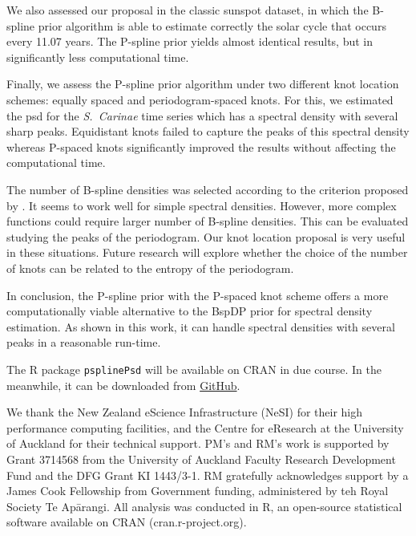 \documentclass[twocolumn,final]{svjour3}
\begin{document}

We also assessed our proposal in the classic sunspot dataset, in which the B-spline prior algorithm is able to estimate correctly the solar cycle that occurs every 11.07 years.  The P-spline prior yields almost identical results, but in  significantly  less computational time.  

Finally, we assess the P-spline prior algorithm under two different knot location schemes: equally spaced and periodogram-spaced knots.  For this, we estimated the psd for the {\it S.\ Carinae} time series which has a spectral density with several sharp peaks.  Equidistant knots failed to capture the peaks of this spectral density whereas  P-spaced knots significantly improved  the results without affecting the computational time.

The number of B-spline densities was selected according to the criterion proposed by \cite{Ruppert2002}.  It seems to work well for simple spectral densities.  However, more complex functions could require larger number of B-spline densities.  This can be evaluated studying the peaks of the periodogram.  Our knot location proposal is very useful in these situations.  Future research will explore whether the choice of the number of knots can be related to the entropy of the periodogram.

In conclusion, the P-spline prior with the P-spaced knot scheme offers a more computationally viable alternative to the BspDP prior for spectral density estimation.  As shown in this work, it can handle spectral densities with several peaks in a reasonable run-time.

The \textsf{R} package \texttt{psplinePsd} will be available on CRAN in due course.  In the meanwhile, it can be downloaded from \href{https://github.com/pmat747/psplinePsd}{GitHub}. 

\begin{acknowledgements}
	We thank the New Zealand eScience Infrastructure (NeSI) for their high performance computing facilities, and the Centre for eResearch at the University of Auckland for their technical support. PM's and RM's work is supported by Grant 3714568 from the University of Auckland Faculty Research Development Fund and the DFG Grant KI 1443/3-1. RM gratefully acknowledges support by a James Cook Fellowship from Government funding, administered by teh Royal Society Te Ap\={a}rangi.  All analysis was conducted in \textsf{R}, an open-source statistical software available on \textsf{CRAN} (cran.r-project.org).
\end{acknowledgements}



%

\end{document}
